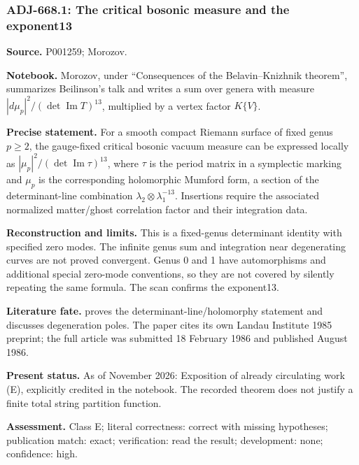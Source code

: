 \subsubsection{ADJ-668.1: The critical bosonic measure and the exponent13}
\noindent\textbf{Source.} P001259; Morozov.\par
\noindent\textbf{Notebook.} Morozov, under ``Consequences of the Belavin--Knizhnik theorem'', summarizes Beilinson's talk and writes a sum over genera with measure \(|d\mu_p|^2/(\det\operatorname{Im}T)^{13}\), multiplied by a vertex factor \(K\{V\}\).\par

\noindent\textbf{Precise statement.} For a smooth compact Riemann surface of fixed genus \(p\ge2\), the gauge-fixed critical bosonic vacuum measure can be expressed locally as \(|\mu_p|^2/(\det\operatorname{Im}\tau)^{13}\), where \(\tau\) is the period matrix in a symplectic marking and \(\mu_p\) is the corresponding holomorphic Mumford form, a section of the determinant-line combination \(\lambda_2\otimes\lambda_1^{-13}\). Insertions require the associated normalized matter/ghost correlation factor and their integration data.\par

\noindent\textbf{Reconstruction and limits.} This is a fixed-genus determinant identity with specified zero modes. The infinite genus sum and integration near degenerating curves are not proved convergent. Genus 0 and 1 have automorphisms and additional special zero-mode conventions, so they are not covered by silently repeating the same formula. The scan confirms the exponent13.\par

\noindent\textbf{Literature fate.} \citet[\S\S2--5, especially (2.19), (3.4), and (5.1)]{belavinknizhnik1986complex} proves the determinant-line/holomorphy statement and discusses degeneration poles. The paper cites its own Landau Institute 1985 preprint; the full article was submitted 18 February 1986 and published August 1986.\par

\noindent\textbf{Present status.} As of November 2026: Exposition of already circulating work (E), explicitly credited in the notebook. The recorded theorem does not justify a finite total string partition function.\par

\noindent\textbf{Assessment.} Class E; literal correctness: correct with missing hypotheses; publication match: exact; verification: read the result; development: none; confidence: high.\par

